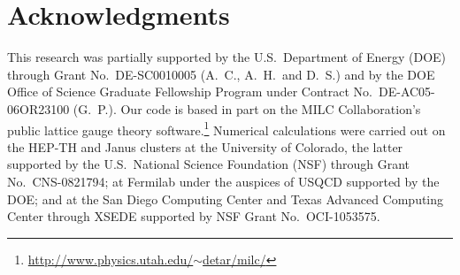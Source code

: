 \documentclass{PoS}
\begin{document}
\section*{Acknowledgments}
This research was partially supported by the U.S.~Department of Energy (DOE) through Grant No.~DE-SC0010005 (A.~C., A.~H.\ and D.~S.) and by the DOE Office of Science Graduate Fellowship Program under Contract No.~DE-AC05-06OR23100 (G.~P.).
Our code is based in part on the MILC Collaboration's public lattice gauge theory software.\footnote{\href{http://www.physics.utah.edu/~detar/milc/}{http://www.physics.utah.edu/$\sim$detar/milc/}}
Numerical calculations were carried out on the HEP-TH and Janus clusters at the University of Colorado, the latter supported by the U.S.~National Science Foundation (NSF) through Grant No.~CNS-0821794; at Fermilab under the auspices of USQCD supported by the DOE; and at the San Diego Computing Center and Texas Advanced Computing Center through XSEDE supported by NSF Grant No.~OCI-1053575.



{\renewcommand{\baselinestretch}{0.86} %
  
  
}
\end{document}
